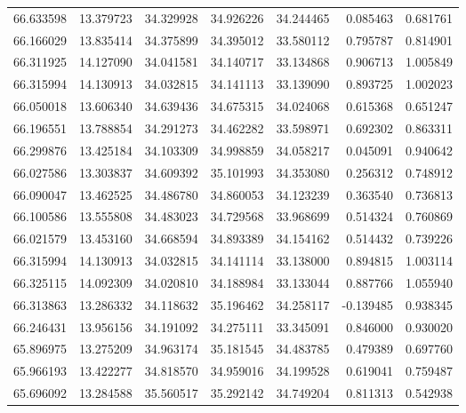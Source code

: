 \begin{tabular}{rrrrrrr}
 66.633598 &  13.379723 &         34.329928 &         34.926226 &         34.244465 &  0.085463 &  0.681761 \\
 66.166029 &  13.835414 &         34.375899 &         34.395012 &         33.580112 &  0.795787 &  0.814901 \\
 66.311925 &  14.127090 &         34.041581 &         34.140717 &         33.134868 &  0.906713 &  1.005849 \\
 66.315994 &  14.130913 &         34.032815 &         34.141113 &         33.139090 &  0.893725 &  1.002023 \\
 66.050018 &  13.606340 &         34.639436 &         34.675315 &         34.024068 &  0.615368 &  0.651247 \\
 66.196551 &  13.788854 &         34.291273 &         34.462282 &         33.598971 &  0.692302 &  0.863311 \\
 66.299876 &  13.425184 &         34.103309 &         34.998859 &         34.058217 &  0.045091 &  0.940642 \\
 66.027586 &  13.303837 &         34.609392 &         35.101993 &         34.353080 &  0.256312 &  0.748912 \\
 66.090047 &  13.462525 &         34.486780 &         34.860053 &         34.123239 &  0.363540 &  0.736813 \\
 66.100586 &  13.555808 &         34.483023 &         34.729568 &         33.968699 &  0.514324 &  0.760869 \\
 66.021579 &  13.453160 &         34.668594 &         34.893389 &         34.154162 &  0.514432 &  0.739226 \\
 66.315994 &  14.130913 &         34.032815 &         34.141114 &         33.138000 &  0.894815 &  1.003114 \\
 66.325115 &  14.092309 &         34.020810 &         34.188984 &         33.133044 &  0.887766 &  1.055940 \\
 66.313863 &  13.286332 &         34.118632 &         35.196462 &         34.258117 & -0.139485 &  0.938345 \\
 66.246431 &  13.956156 &         34.191092 &         34.275111 &         33.345091 &  0.846000 &  0.930020 \\
 65.896975 &  13.275209 &         34.963174 &         35.181545 &         34.483785 &  0.479389 &  0.697760 \\
 65.966193 &  13.422277 &         34.818570 &         34.959016 &         34.199528 &  0.619041 &  0.759487 \\
 65.696092 &  13.284588 &         35.560517 &         35.292142 &         34.749204 &  0.811313 &  0.542938 \\

\end{tabular}
